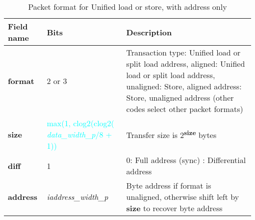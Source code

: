 \begin{table}[htp]
  \centering
  \caption{Packet format for Unified load or store, with address only}
  \label{tab:te_datadx0y1}
  \begin{tabulary}{\textwidth}{|l|p{38mm}|p{92mm}|}
    \hline
    {\bf Field name} & {\bf Bits} & {\bf Description} \\
    \hline
    \textbf{format} & 	2 or 3	& Transaction type: Unified load or split load address, aligned: Unified load or split load address, unaligned: Store, aligned address: Store, unaligned address\newline
		(other codes select other packet formats)\\
    \hline
    \textbf{size} & \textcolor{cyan}{max(1, clog2(clog2( \textit{data\_width\_p}/8 + 1))} & Transfer size is 2\textsuperscript{\textbf{size}} bytes \\
    \hline
    \textbf{diff} & 1 & 0: Full address (sync)	:  Differential address\\
    \hline
    \textbf{address} &  \textit{iaddress\_width\_p} & Byte address if format is unaligned, otherwise shift left by \textbf{size} to recover byte address \\
    \hline
  \end{tabulary}
\end{table}



